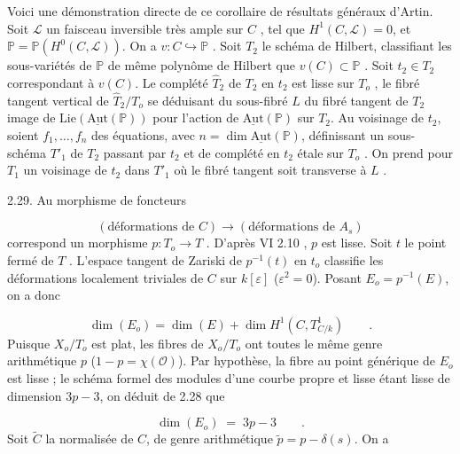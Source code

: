 Voici une démonstration directe de ce corollaire de résultats généraux d'Artin. Soit $\mathcal{L}$ un faisceau inversible très ample sur $C$ , tel que $H^1(C,\mathcal{L}) = 0$, et $\mathbb{P} = \mathbb{P}(H^0(C,\mathcal{L}))$. On a $v : C \hookrightarrow \mathbb{P}$ . Soit $T_2$ le schéma de Hilbert, classifiant les sous-variétés de $\mathbb{P}$ de même polynôme de Hilbert que $v(C) \subset \mathbb{P}$ . Soit $t_2 \in T_2$ correspondant à $v(C)$. Le complété $\hat{T}_2$ de $T_2$ en $t_2$ est lisse sur $T_o$ , le fibré tangent vertical de $\hat{T}_2/T_o$ se déduisant du sous-fibré $L$ du fibré tangent de $T_2$ image de $\mathrm{Lie}(\underline{\mathrm{Aut}}(\mathbb{P}))$ pour l'action de $\underline{\mathrm{Aut}}(\mathbb{P})$ sur $T_2$. Au voisinage de $t_2$, soient $f_1, \ldots, f_n$ des équations, avec $n = \dim \underline{\mathrm{Aut}}(\mathbb{P})$, définissant un sous-schéma $T'_1$ de $T_2$ passant par $t_2$ et de complété en $t_2$ étale sur $T_o$ . On prend pour $T_1$ un voisinage de $t_2$ dans $T'_1$ où le fibré tangent soit transverse à $L$ .



2.29. Au morphisme de foncteurs

\begin{equation*}
(\text{déformations de } C) \longrightarrow (\text{déformations de } A_s)
\end{equation*}
correspond un morphisme $p : T_o \longrightarrow T$ . D'après VI 2.10 \qquad , $p$ est lisse. Soit $t$ le point fermé de $T$ . L'espace tangent de Zariski de $p^{-1}(t)$ en $t_o$ classifie les déformations localement triviales de $C$ sur $k[\varepsilon]$ ($\varepsilon^2 = 0$). Posant $E_o = p^{-1}(E)$, on a donc

\begin{equation}\tag{2.29.1}
\dim(E_o) = \dim(E) + \dim H^1(C, T^1_{C/k}) \qquad .
\end{equation}
Puisque $X_o/T_o$ est plat, les fibres de $X_o/T_o$ ont toutes le même genre arithmétique $p$ ($1-p = \chi(\mathcal{O})$). Par hypothèse, la fibre au point générique de $E_o$ est lisse ; le schéma formel des modules d'une courbe propre et lisse étant lisse de dimension $3p-3$, on déduit de 2.28 que

\begin{equation}\tag{2.29.2}
\dim(E_o) \;=\; 3p-3 \qquad .
\end{equation}
Soit $\widetilde{C}$ la normalisée de $C$, de genre arithmétique $\widetilde{p} = p - \delta(s)$. On a

